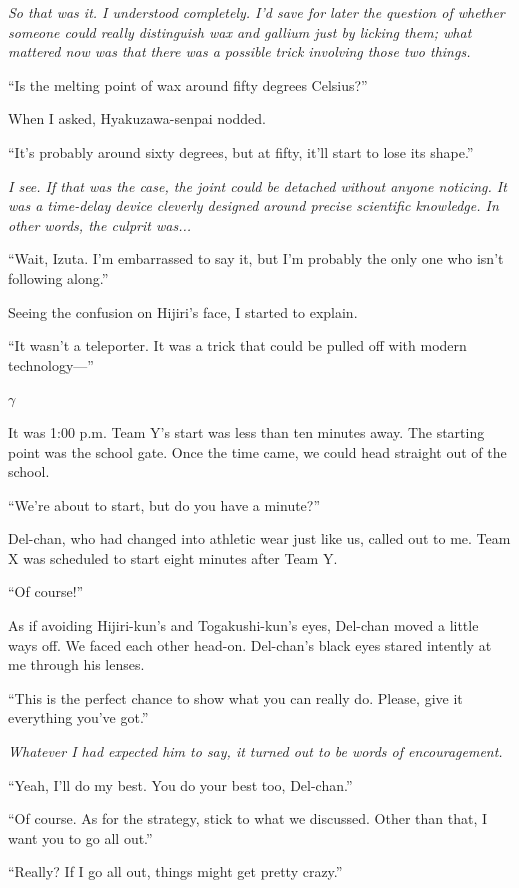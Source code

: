 \documentclass[
    a4paper,
    12pt,
    twoside,
    openany,
    UTF8,
    fontset=windows
]{ctexbook}
\begin{document}
\textit{So that was it. I understood completely. I'd save for later the question of whether someone could really distinguish wax and gallium just by licking them; what mattered now was that there was a possible trick involving those two things.}

``Is the melting point of wax around fifty degrees Celsius?''

When I asked, Hyakuzawa-senpai nodded.

``It's probably around sixty degrees, but at fifty, it'll start to lose its shape.''

\textit{I see. If that was the case, the joint could be detached without anyone noticing. It was a time-delay device cleverly designed around precise scientific knowledge. In other words, the culprit was...}

``Wait, Izuta. I'm embarrassed to say it, but I'm probably the only one who isn't following along.''

Seeing the confusion on Hijiri's face, I started to explain.

``It wasn't a teleporter. It was a trick that could be pulled off with modern technology---''

$\gamma$

It was 1:00 p.m. Team Y's start was less than ten minutes away. The starting point was the school gate. Once the time came, we could head straight out of the school.

``We're about to start, but do you have a minute?''

Del-chan, who had changed into athletic wear just like us, called out to me. Team X was scheduled to start eight minutes after Team Y.

``Of course!''

As if avoiding Hijiri-kun's and Togakushi-kun's eyes, Del-chan moved a little ways off. We faced each other head-on. Del-chan's black eyes stared intently at me through his lenses.

``This is the perfect chance to show what you can really do. Please, give it everything you've got.''

\textit{Whatever I had expected him to say, it turned out to be words of encouragement.}

``Yeah, I'll do my best. You do your best too, Del-chan.''

``Of course. As for the strategy, stick to what we discussed. Other than that, I want you to go all out.''

``Really? If I go all out, things might get pretty crazy.''
\end{document}
